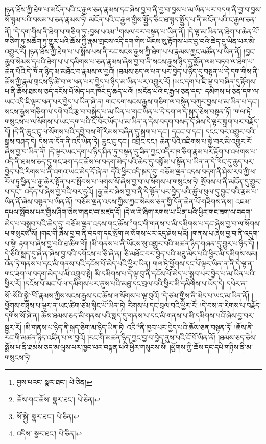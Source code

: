 །ཉན་ཐོས་ཀྱི་ཐེག་པ་མངོན་པའི་ང་རྒྱལ་ཅན་རྣམས་དང་ཞེས་བྱ་བ་ནི་བྱ་བ་བྱས་པ་མ་ཡིན་པར་བདག་ནི་བྱ་བ་བྱས་སོ་སྙམ་པའི་བསམ་པ་ཅན་རྣམས་ཏེ། མངོན་པའི་ང་རྒྱལ་གྱིས་སྤྱོད་ཅིང་ཐ་སྙད་སྤྱོད་པ་ནི་མངོན་པའི་ང་རྒྱལ་ཅན་ནོ། །དེ་དག་གིས་ནི་ཐེག་པ་གཅིག་ཏུ་:བྱས་པའམ་\footnote{བྱས་པའང་  སྣར་ཐང་།  པེ་ཅིན། }གསལ་བར་བསྟན་པ་ཡིན་ནོ། །དེ་ལྟ་མ་ཡིན་ན་ཐེག་པ་ཆེན་པོ་གཅིག་ཏུ་མཆོག་ཏུ་གྱུར་པའི་ཆོས་ཀྱི་རྣམ་གྲངས་འདི་དག་གིས་ཡོངས་སུ་རྟོགས་པར་བྱ་བའི་ཆེད་དུ་ཡིན་པར་མི་འགྱུར་རོ། །ཉན་ཐོས་ཀྱི་ཐེག་པ་པ་སྨོས་པས་ནི་རང་སངས་རྒྱས་ཀྱི་ཐེག་པ་པ་རྣམས་ཀྱང་མཚོན་པ་ཡིན་ནོ། །བྱང་ཆུབ་སེམས་དཔའི་ཐེག་པ་པ་དམིགས་པ་ཅན་རྣམས་ཞེས་བྱ་བ་ནི་སངས་རྒྱས་ཉིད་དུ་སྨོན་ལམ་བཏབ་ལ་ཐེག་པ་ཆེན་པོའི་དེ་ཁོ་ན་ཉིད་མ་མཐོང་བ་རྣམས་ལ་བྱའོ། །ཐམས་ཅད་ལ་ཕན་པར་བྱེད་པ་ཉིད་དུ་བསྟན་པ་དེ་དག་གིས་ནི་ཆོས་ཀྱི་རྣམ་གྲངས་ཉི་ཚེ་བ་ལ་ཕན་པར་བྱེད་པ་ཉིད་མ་ཡིན་པར་འགྱུར་རོ། །ཡང་དག་པ་ཇི་ལྟ་བ་བཞིན་དུ་རྟོགས་པ་ནི་ཆོས་ཐམས་ཅད་དངོས་པོ་མེད་པར་ཁོང་དུ་ཆད་པའོ། །མངོན་པའི་ང་རྒྱལ་ཅན་དང་། དམིགས་པ་ཅན་དག་ལ་ཡང་འདི་ཇི་ལྟར་ཕན་པར་བྱེད་པ་ཡིན་ཞེ་ན། གང་དག་སངས་རྒྱས་གཅིག་ལ་བསྙེན་བཀུར་བྱས་པ་མ་ཡིན་པ་དང་། སངས་རྒྱས་གཅིག་ལ་དགེ་བའི་རྩ་བ་བསྐྱེད་པ་མ་ཡིན་པ་གང་ཡིན་པ་དེ་དག་ལ་དེ་སྐད་ཅེས་བསྟན་ཏོ། །གལ་ཏེ་གསུངས་པ་ལ་སོགས་པ་ཡང་དག་པའི་ངོ་བོར་ཡོད་པ་མ་ཡིན་ན་དེས་བདག་བསད་དོ་ཞེས་དེ་ལྟར་སྐྲག་པར་བརྗོད་དོ། །དེ་ནི་ཆུང་ངུ་ལ་སོགས་པའི་དབྱེ་བས་གོ་རིམས་བཞིན་དུ་སྐྲག་པ་དང་། དངང་བ་དང་། དངང་བར་འགྱུར་བའི་སྒྲས་བཤད་དེ། དེས་ན་དོན་ནི་འདི་ཡིན་ཏེ། ཆུང་ངུ་དང་། འབྲིང་དང་། ཆེན་པོའི་འཇིགས་པ་སྐྱེ་བར་མི་འགྱུར་རོ་ཞེས་བྱ་བ་ཡིན་ནོ། །དེ་ལྟར་ཡང་དག་པ་ཉིད་ཤིན་ཏུ་བསྟན་དུ་ཟིན་ཀྱང་འདིར་ཁ་ཅིག་རྣམ་པར་རྟོག་པ་འཕགས་པ་འདི་ནི་ཐམས་ཅད་དུ་གང་ཟག་དང་ཆོས་ལ་བདག་མེད་པའི་ཆེད་དུ་བསྒོམ་པ་སྟོན་པ་ཡིན་ན་དེ་ཁོང་དུ་ཆུད་པར་བྱེད་པའི་རིགས་པ་ནི་འགའ་ཡང་མེད་དོ་ཞེ་ན། དེའི་ཕྱིར་འདི་སྐད་དུ། བཅོམ་ལྡན་འདས་བདག་ནི་ཤེས་རབ་ཀྱི་ཕ་རོལ་ཏུ་ཕྱིན་པ་རྒྱ་ཆེར་སྟོན་པར་སྤོབས་པ་ལགས་སོ་ཞེས་བྱ་བ་ལ་སོགས་པ་གསུངས་ཏེ། སྤོབས་པ་ནི་མངོན་དུ་གྱུར་པ་དང་། འདོད་པ་ཞེས་བྱ་བའི་བར་དུའོ། །རྒྱ་ཆེར་ཞེས་བྱ་བ་ནི་དེ་སྟོན་པར་བྱེད་པའི་ཚུལ་ཕུལ་དུ་བྱུང་བའི་རྣམ་པ་ཡིན་ནོ་ཞེས་བསྟན་པ་ཡིན་ནོ། །བཅོམ་ལྡན་འདས་ཀྱིས་ཀྱང་སེམས་ཅན་གྱི་དོན་ཆེན་པོ་གཟིགས་ནས། འཇམ་དཔལ་སྤོབས་པར་གྱིས་ཤིག་ཅེས་གནང་བ་མཛད་དོ། །དེ་ལ་རེ་ཞིག་རགས་པ་ཡིན་པའི་ཕྱིར་གང་ཟག་ལ་བདག་མེད་པ་བསྒྲུབ་པའི་ཆེད་དུ། བཅོམ་ལྡན་འདས་གང་ཆོས་\footnote{ཆོས་གང་ཆོས་  སྣར་ཐང་།  པེ་ཅིན། }གང་གི་གནས་པ་མི་དམིགས་པ་དང་ཞེས་བྱ་བ་ལ་སོགས་པ་གསུངས་སོ། །གང་གི་ཞེས་བྱ་བ་ནི་བདག་དང་སྲོག་ལ་སོགས་པར་འདུ་ཤེས་པའོ། །གནས་པ་ཞེས་བྱ་བ་ནི་འདུག་པ་སྟེ། རྟག་པ་ཞེས་བྱ་བའི་ཐ་ཚིག་གོ། །མི་གནས་པ་ནི་ཡོངས་སུ་འགྱུར་བའི་མཚན་ཉིད་གཞན་དུ་གྱུར་པ་ཉིད་དོ། །དེ་ཅིའི་སླད་དུ་ཞེ་ན་ཞེས་བྱ་བའི་དགོངས་པ་ཅི་ཞེ་ན། ཅི་མཐོང་བར་བྱེད་པའི་མཐུ་མེད་པའི་ཕྱིར་མི་དམིགས་སམ། འོན་ཏེ་གནས་པ་དང་མི་གནས་པའི་དངོས་པོ་མེད་པའི་ཕྱིར་ཡིན། གལ་ཏེ་ཕྱོགས་དང་པོ་ལྟར་ཡིན་ན་ནི་དེ་ལྟ་ན་གང་ཟག་ལ་བདག་མེད་པ་མི་འགྲུབ་སྟེ། མི་དམིགས་པ་དེ་ལྟ་བུ་ནི་དངོས་པོ་མེད་པ་སྒྲུབ་པར་བྱེད་པ་མ་ཡིན་པའི་ཕྱིར་རོ། །དངོས་པོ་མང་པོ་ལ་དམིགས་པར་ནུས་པའི་མཐུ་དང་བྲལ་བའི་ཕྱིར་མི་དམིགས་པ་ཡོད་དེ། དཔེར་ན་སོ་:སོའི་སྐྱེ་\footnote{སོ་སྐྱེ་  སྣར་ཐང་།  པེ་ཅིན། }བོ་རྣམས་ཀྱིས་སངས་རྒྱས་དང་ཆོས་ལ་སོགས་པ་ལྟ་བུའོ། །དེ་ཙམ་གྱིས་ནི་མེད་པ་ཡང་མ་ཡིན་ནོ། །ཕྱོགས་གཉིས་པ་ལྟར་ན་ཡང་ཚིག་ཙམ་སྙིང་པོ་ཡིན་ཏེ། རིགས་པ་དང་བྲལ་བའི་ཕྱིར་རོ། །དེ་བས་ན་རིགས་པ་བརྗོད་དགོས་སོ་ཞེ་ན། ཆོས་ཐམས་ཅད་མི་གནས་པའི་སླད་དུ་གནས་པ་དང་མི་གནས་པ་མི་དམིགས་པའོ་ཞེས་བྱ་བར་སྦྱར་རོ། །མི་གནས་པ་ཉིད་ནི་སྐད་ཅིག་མ་ཉིད་ཡིན་ཏེ། འདི་\footnote{འདིས་  སྣར་ཐང་།  པེ་ཅིན། }ནི་ཁྱབ་པར་བྱེད་པའི་ཆོས་ཅན་བསྟན་ཏོ། །ཆོས་ནི་རང་གི་མཚན་ཉིད་འཛིན་པ་ལ་བྱའོ། །རང་གི་མཚན་ཉིད་ཀྱང་བྱ་བ་བྱེད་ནུས་པའི་ངོ་བོ་ཡིན་ནོ། །ཐམས་ཅད་ཅེས་སྨོས་པ་ནི་ཐམས་ཅད་མ་ལུས་པར་ཁྱབ་པར་བསྟན་པའི་ཕྱིར་གསུངས་སོ། །ཕྱོགས་ཀྱི་ཆོས་དང་དཔེ་གཉིས་ནི་མ་གསུངས་ཏེ། 